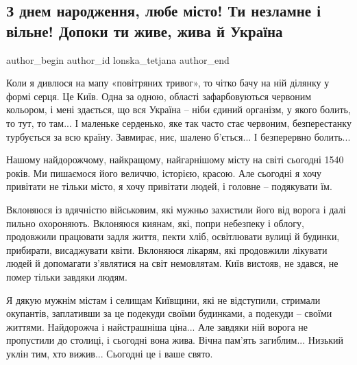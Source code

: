  
 
 
 
 
 
\subsection{З днем народження, любе місто! Ти незламне і вільне! Допоки ти живе, жива й Україна}
\label{sec:29_05_2022.fb.lonska_tetjana.1.den_kyiv}
 
\ifcmt
 author_begin
   author_id lonska_tetjana
 author_end
\fi

Коли я дивлюся на мапу «повітряних тривог», то чітко бачу на ній ділянку у
формі серця. Це Київ. Одна за одною, області зафарбовуються червоним кольором,
і мені здається, що вся Україна – ніби єдиний організм, у якого болить, то тут,
то там...  І маленьке серденько, яке так часто стає червоним, безперестанку
турбується за всю країну. Завмирає, ниє, шалено б'ється...  І безперервно болить...

Нашому найдорожчому, найкращому, найгарнішому місту на світі сьогодні 1540
років. Ми пишаємося його величчю, історією, красою.  Але сьогодні я хочу
привітати не тільки місто, я хочу привітати людей, і головне – подякувати
їм.

Вклоняюся із вдячністю військовим, які мужньо захистили його від ворога і
далі пильно охороняють. Вклоняюся киянам, які, попри небезпеку і облогу,
продовжили працювати задля життя, пекти хліб, освітлювати вулиці й
будинки, прибирати, висаджувати квіти. Вклоняюся лікарям, які продовжили
лікувати людей й допомагати з'являтися на світ немовлятам.  Київ вистояв,
не здався, не помер тільки завдяки людям.

Я дякую мужнім містам і селищам Київщини,  які не відступили, стримали
окупантів, заплативши за це подекуди своїми будинками, а подекуди –
своїми життями. Найдорожча і найстрашніша ціна... Але завдяки ній ворога не
пропустили до столиці, і сьогодні вона жива.  Вічна пам'ять загиблим...
Низький уклін тим, хто вижив... Сьогодні це і ваше свято.

